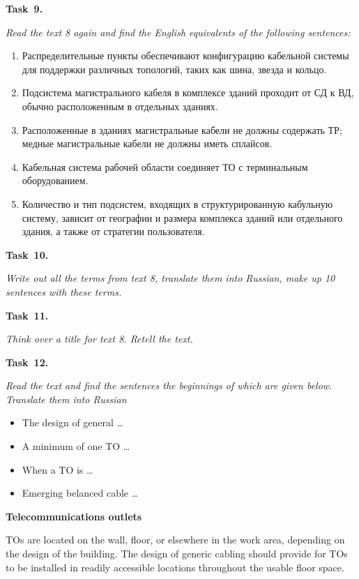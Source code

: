 {\bf Task~9.}~~{\it Read the text 8 again and find the English equivalents of the following sentences: \par}

\begin{enumerate}
    \item {Распределительные пункты обеспечивают конфигурацию кабельной системы для поддержки различных топологий,
    таких как шина, звезда и кольцо}.
    \item {Подсистема магистрального кабеля в комплексе зданий проходит от СД к ВД, обычно расположенным в отдельных
    зданиях}.
    \item {Расположенные в зданиях магистральные кабели не должны содержать ТР; медные магистральные кабели не должны
    иметь сплайсов}.
    \item {Кабельная система рабочей области соединяет ТО с терминальным оборудованием}.
    \item {Количество и тип подсистем, входящих в структурированную кабульную систему, зависит от географии и размера
    комплекса зданий или отдельного здания, а также от стратегии пользователя}.
\end{enumerate}

{\bf Task~10.}~~{\it Write out all the terms from text 8, translate them into Russian, make up 10 sentences with
these terms. \par}

{\bf Task~11.}~~{\it Think over a title for text 8. Retell the text. \par}

{\bf Task~12.}~~{\it Read the text and find the sentences the beginnings of which are given below. Translate them into
Russian \par}

\begin{itemize}
    \item The design of general \dots
    \item A minimum of one TO \dots
    \item When a TO is \dots
    \item Emerging belanced cable \dots
\end{itemize}

\begin{center}
    \textbf{Telecommunications outlets}\par\par
\end{center}

TOs are located on the wall, floor, or elsewhere in the work area, depending on the design of the building. The design of 
generic cabling should provide for TOs to be installed in readily accessible locations throughout the usable floor space.\par

